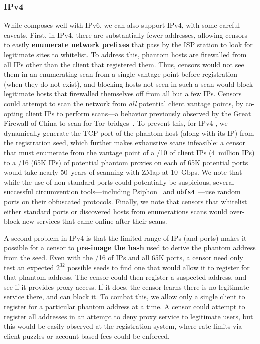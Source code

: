 \documentclass[sigconf,anonymous]{acmart}
\begin{document}
\subsubsection{IPv4}
While \scheme composes well with IPv6, we can also support IPv4, with some
careful caveats. First, in IPv4, there are substantially fewer addresses,
allowing censors to easily \textbf{enumerate network prefixes} that pass by the ISP
station to look for legitimate sites to whitelist. To address this, \scheme
phantom hosts are firewalled from all IPs other than the client that registered
them. Thus, censors would not see them in an enumerating scan from a single
vantage point before registration (when they do not exist), and blocking hosts
not seen in such a scan would block legitimate hosts that firewalled themselves
off from all but a few IPs. %
Censors could attempt to scan the network from \emph{all} potential client
vantage points, by co-opting client IPs to perform scans---a behavior previously
observed by the Great Firewall of China to scan for Tor bridges~\cite{ensafi-tor}.
To prevent this, for IPv4 \scheme, we dynamically generate the TCP port of the
phantom host (along with its IP) from the registration seed, which further makes
exhaustive scans infeasible:
a censor that must enumerate from the vantage point of a /10 of client IPs (4~million IPs)
to a /16 (65K IPs) of potential phantom proxies on each of 65K potential ports would take nearly
50~years of scanning with ZMap at 10~Gbps. We note that while the use of
non-standard ports could potentially be suspicious, several successful
circumvention tools---including Psiphon~\cite{psiphon} and
\texttt{obfs4}~\cite{obfs4}---use random ports on their obfuscated protocols.
Finally, we note that censors that whitelist either standard ports or discovered
hosts from enumerations scans would over-block new services that came online after
their scans.

A second problem in IPv4 \scheme is that the limited range of IPs (and ports)
makes it possible for a censor to \textbf{pre-image the hash} used to derive the phantom
address from the seed. Even with the /16 of IPs and all 65K ports, a censor need
only test an expected $2^{32}$ possible seeds to find one that would allow it
to register for that phantom address. The censor could then register a suspected
address, and see if it provides proxy access. If it does, the censor learns
there is no legitimate service there, and can block it. To combat this, we
allow only a single client to register for a particular phantom address at a
time. A censor could attempt to register all addresses in an attempt to deny
proxy service to legitimate users, but this would be easily observed at the
registration system, where rate limits via client puzzles or account-based fees
could be enforced.
\end{document}

